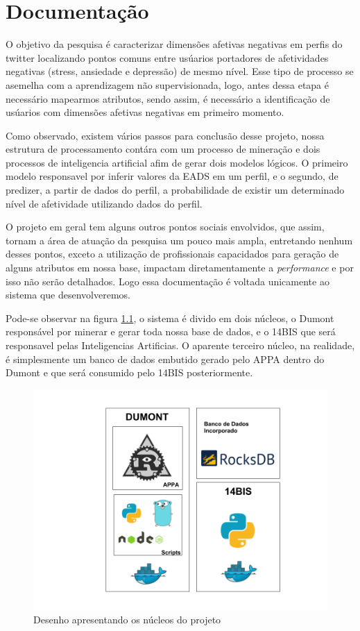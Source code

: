 \chapter{Documentação}
O objetivo da pesquisa é caracterizar dimensões afetivas negativas em perfis do twitter localizando pontos comuns entre usúarios portadores de afetividades negativas (stress, ansiedade e depressão) de mesmo nível. Esse tipo de processo se asemelha com a aprendizagem não supervisionada, logo, antes dessa etapa é necessário mapearmos atributos, sendo assim, é necessário a identificação de usúarios com dimensões afetivas negativas em primeiro momento.

Como observado, existem vários passos para conclusão desse projeto, nossa estrutura de processamento contára com um processo de mineração e dois processos de inteligencia artificial afim de gerar dois modelos lógicos. O primeiro modelo responsavel por inferir valores da EADS em um perfil, e o segundo, de predizer, a partir de dados do perfil, a probabilidade de existir um determinado nível de afetividade utilizando dados do perfil.

O projeto em geral tem alguns outros pontos sociais envolvidos, que assim, tornam a área de atuação da pesquisa um pouco mais ampla, entretando nenhum desses pontos, exceto a utilização de profissionais capacidados para geração de alguns atributos em nossa base, impactam diretamentamente a \textit{performance} e por isso não serão detalhados. Logo essa documentação é voltada unicamente ao sistema que desenvolveremos.

Pode-se observar na figura \ref{fig:tecnologias}, o sistema é divido em dois núcleos, o Dumont responsável por minerar e gerar toda nossa base de dados, e o 14BIS que será responsavel pelas Inteligencias Artificias. O aparente terceiro núcleo, na realidade, é simplesmente um banco de dados embutido gerado pelo APPA dentro do Dumont e que será consumido pelo 14BIS posteriormente.

\begin{figure}
    \centering
    \includegraphics[width=.8\textwidth]{imagens/tecnologias.png}
    \caption{Desenho apresentando os núcleos do projeto}
    \label{fig:tecnologias}
\end{figure}

